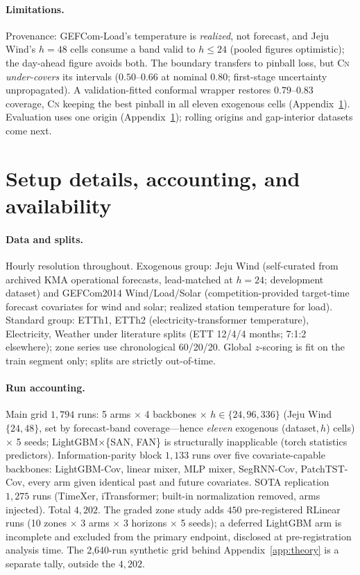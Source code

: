 \documentclass{article}
\newcommand{\cnm}{\textsc{Cn}}
\begin{document}
\paragraph{Limitations.} Provenance: GEFCom-Load's
temperature is \emph{realized}, not forecast, and Jeju Wind's
$h{=}48$ cells consume a band valid to $h\le24$ (pooled figures optimistic);
the day-ahead figure avoids both. The boundary transfers to pinball loss, but \cnm{} \emph{under-covers} its
intervals ($0.50$--$0.66$ at nominal $0.80$; first-stage uncertainty
unpropagated). A validation-fitted conformal wrapper restores $0.79$--$0.83$
coverage, \cnm{} keeping the best pinball in all eleven exogenous cells
(Appendix~\ref{app:setup}).
Evaluation uses one origin (Appendix~\ref{app:setup}); rolling origins and
gap-interior datasets come next.

\small



\normalsize
\appendix
\section{Setup details, accounting, and availability}\label{app:setup}

\paragraph{Data and splits.} Hourly resolution throughout. Exogenous group: Jeju
Wind (self-curated from archived KMA operational forecasts, lead-matched at
$h{=}24$; development dataset) and GEFCom2014 Wind/Load/Solar
\citep{hong2016gefcom} (competition-provided target-time forecast covariates for
wind and solar; realized station temperature for load). Standard group: ETTh1,
ETTh2 (electricity-transformer temperature), Electricity, Weather under
literature splits (ETT 12/4/4 months; 7:1:2 elsewhere); zone series use
chronological 60/20/20. Global $z$-scoring is fit on
the train segment only; splits are strictly out-of-time.

\paragraph{Run accounting.} Main grid $1{,}794$ runs: 5 arms $\times$ 4 backbones
$\times$ $h\in\{24,96,336\}$ (Jeju Wind $\{24,48\}$, set by forecast-band
coverage---hence \emph{eleven} exogenous (dataset,\,$h$) cells) $\times$ 5 seeds;
LightGBM$\times$\{SAN, FAN\} is structurally inapplicable (torch statistics
predictors). Information-parity block $1{,}133$ runs over five covariate-capable
backbones: LightGBM-Cov, linear mixer, MLP mixer, SegRNN-Cov, PatchTST-Cov, every
arm given identical past and future covariates. SOTA replication $1{,}275$ runs
(TimeXer, iTransformer; built-in normalization removed, arms injected). Total
$4{,}202$. The graded zone study adds $450$ pre-registered RLinear runs (10 zones
$\times$ 3 arms $\times$ 3 horizons $\times$ 5 seeds); a deferred LightGBM arm is
incomplete and excluded from the primary endpoint, disclosed at pre-registration
analysis time. The 2{,}640-run synthetic grid behind
Appendix~\ref{app:theory} is a separate tally, outside the $4{,}202$.
\end{document}
